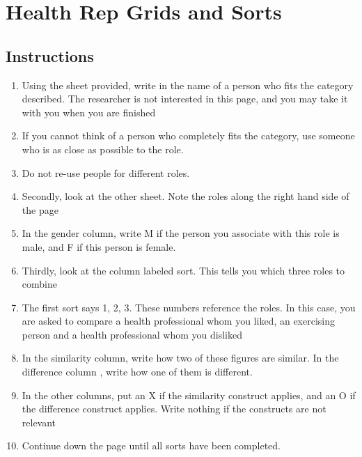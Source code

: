 
\section{Health Rep Grids and Sorts}
\label{sec:health-rep-grids}

\subsection{Instructions}
\label{sec:instructions}

\begin{enumerate}
\item Using the sheet provided, write in the name of a person who fits the category described. The researcher is not interested in this page, and you may take it with you when you are finished
\item  If you cannot think of a person who completely fits the category, use someone who is as close as possible to the role.
\item  Do not re-use people for different roles.
\item Secondly, look at the other sheet. Note the roles along the right hand side of the page
\item  In the gender column, write M if the person you associate with this role is male, and F if this person is female. 
\item  Thirdly, look at the column labeled sort. This tells you which three roles to combine
\item The first sort says 1, 2, 3. These numbers reference the roles. In this case, you are asked to compare a health professional whom you liked, an exercising person and a health professional whom you disliked
\item  In the similarity column, write how two of these figures are similar. In the difference column , write how one of them is different.
\item In the other columns, put an X if the similarity construct applies, and an O if the difference construct applies. Write nothing if the constructs are not relevant
\item Continue down the page until all sorts have been completed. 
\end{enumerate}

